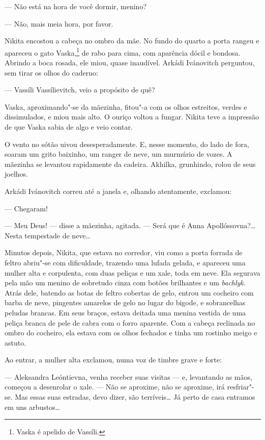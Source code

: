 --- Não está na hora de você dormir, menino?

--- Não, mais meia hora, por favor.

Nikita encostou a cabeça no ombro da mãe. No fundo do quarto a porta
rangeu e apareceu o gato Vaska,\footnote{Vaska é apelido de Vassíli.}
de rabo para cima, com aparência dócil e bondosa. Abrindo a boca rosada,
ele miou, quase inaudível. Arkádi Ivánovitch perguntou, sem tirar os
olhos do caderno:

--- Vassíli Vassílievitch, veio a propósito de quê?

Vaska, aproximando"-se da mãezinha, fitou"-a com os olhos estreitos,
verdes e dissimulados, e miou mais alto. O ouriço voltou a fungar.
Nikita teve a impressão de que Vaska sabia de algo e veio contar.

O vento no sótão uivou desesperadamente. E, nesse momento, do lado de
fora, soaram um grito baixinho, um ranger de neve, um murmúrio de vozes.
A mãezinha se levantou rapidamente da cadeira. Akhilka, grunhindo, rolou
de seus joelhos.

Arkádi Ivánovitch correu até a janela e, olhando atentamente, exclamou:

--- Chegaram!

--- Meu Deus! --- disse a mãezinha, agitada. --- Será que é Anna
Apollóssovna?\ldots{} Nesta tempestade de neve\ldots{}

Minutos depois, Nikita, que estava no corredor, viu como a porta forrada
de feltro abriu"-se com dificuldade, trazendo uma lufada gelada, e
apareceu uma mulher alta e corpulenta, com duas peliças e um xale, toda
em neve. Ela segurava pela mão um menino de sobretudo cinza com
botões brilhantes e um \emph{bachlyk}. Atrás dele, batendo as botas de
feltro cobertas de gelo, entrou um cocheiro com barba de neve, pingentes amarelos
de gelo no lugar do bigode, e sobrancelhas peludas brancas. Em
seus braços, estava deitada uma menina vestida de uma peliça branca de
pele de cabra com o forro aparente. Com a cabeça reclinada no ombro do
cocheiro, ela estava com os olhos fechados e tinha um rostinho meigo e
astuto.

Ao entrar, a mulher alta exclamou, numa voz de timbre grave e forte:

--- Aleksandra Leóntievna, venha receber suas visitas --- e, levantando
as mãos, começou a desenrolar o xale. --- Não se aproxime, não se
aproxime, irá resfriar"-se. Mas essas suas estradas, devo dizer, são
terríveis\ldots{} Já perto de casa entramos em uns arbustos\ldots{}

